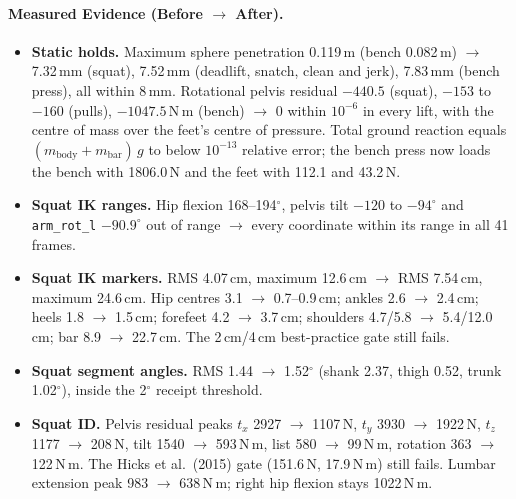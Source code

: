 \documentclass[11pt,a4paper]{article}
\begin{document}
\paragraph{Measured Evidence (Before $\rightarrow$ After).}
\begin{itemize}[nosep]
\item \textbf{Static holds.} Maximum sphere penetration 0.119\,m (bench
  0.082\,m) $\rightarrow$ 7.32\,mm (squat), 7.52\,mm (deadlift, snatch, clean
  and jerk), 7.83\,mm (bench press), all within 8\,mm. Rotational pelvis
  residual $-440.5$ (squat), $-153$ to $-160$ (pulls), $-1047.5$\,N\,m (bench)
  $\rightarrow$ 0 within $10^{-6}$ in every lift, with the centre of mass over
  the feet's centre of pressure. Total ground reaction equals
  $(m_\mathrm{body} + m_\mathrm{bar})\,g$ to below $10^{-13}$ relative error;
  the bench press now loads the bench with 1806.0\,N and the feet with 112.1 and
  43.2\,N.
\item \textbf{Squat IK ranges.} Hip flexion 168--194$^\circ$, pelvis tilt
  $-120$ to $-94^\circ$ and \texttt{arm\_rot\_l} $-90.9^\circ$ out of range
  $\rightarrow$ every coordinate within its range in all 41 frames.
\item \textbf{Squat IK markers.} RMS 4.07\,cm, maximum 12.6\,cm $\rightarrow$
  RMS 7.54\,cm, maximum 24.6\,cm. Hip centres 3.1 $\rightarrow$ 0.7--0.9\,cm;
  ankles 2.6 $\rightarrow$ 2.4\,cm; heels 1.8 $\rightarrow$ 1.5\,cm; forefeet
  4.2 $\rightarrow$ 3.7\,cm; shoulders 4.7/5.8 $\rightarrow$ 5.4/12.0\,cm; bar
  8.9 $\rightarrow$ 22.7\,cm. The 2\,cm/4\,cm best-practice gate still fails.
\item \textbf{Squat segment angles.} RMS 1.44 $\rightarrow$ 1.52$^\circ$ (shank
  2.37, thigh 0.52, trunk 1.02$^\circ$), inside the 2$^\circ$ receipt threshold.
\item \textbf{Squat ID.} Pelvis residual peaks $t_x$ 2927 $\rightarrow$ 1107\,N,
  $t_y$ 3930 $\rightarrow$ 1922\,N, $t_z$ 1177 $\rightarrow$ 208\,N, tilt 1540
  $\rightarrow$ 593\,N\,m, list 580 $\rightarrow$ 99\,N\,m, rotation 363
  $\rightarrow$ 122\,N\,m. The Hicks et al.\ (2015) gate (151.6\,N,
  17.9\,N\,m) still fails. Lumbar extension peak 983 $\rightarrow$ 638\,N\,m;
  right hip flexion stays 1022\,N\,m.
\end{itemize}
\end{document}
